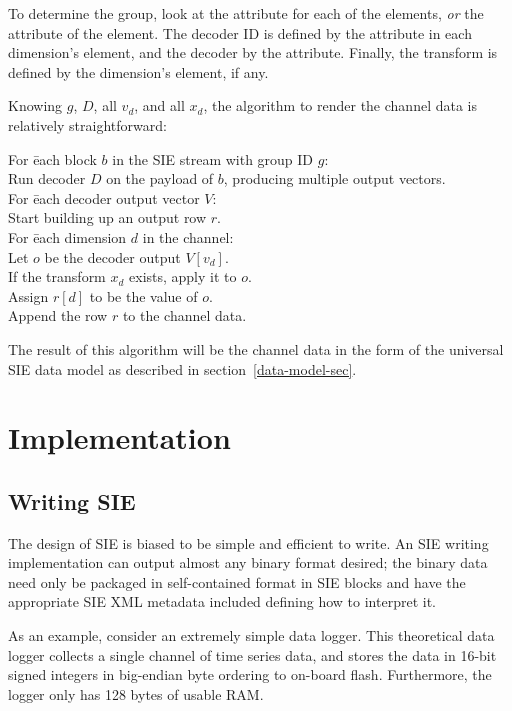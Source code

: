 \documentclass{article}
\begin{document}
To determine the group, look at the  attribute for each of
the  elements, \emph{or} the  attribute of the
 element.  The decoder ID is defined by the 
attribute in each dimension's  element, and the decoder
 by the  attribute.  Finally, the transform is defined
by the dimension's  element, if any.

Knowing $g$, $D$, all $v_d$, and all $x_d$, the algorithm to render
the channel data is relatively straightforward:

\begin{tabbing}
For \= each block $b$ in the SIE stream with group ID $g$: \\
    \> Run decoder $D$ on the payload of $b$, producing multiple
       output vectors. \\
    \> For \= each decoder output vector $V$: \\
    \>     \> Start building up an output row $r$. \\
    \>     \> For \= each dimension $d$ in the channel: \\
    \>     \>     \> Let $o$ be the decoder output $V[v_d]$. \\
    \>     \>     \> If the transform $x_d$ exists, apply it to $o$. \\
    \>     \>     \> Assign $r[d]$ to be the value of $o$. \\
    \>     \> Append the row $r$ to the channel data.
\end{tabbing}

The result of this algorithm will be the channel data in the form of
the universal SIE data model as described in
section~\ref{data-model-sec}.

\section{Implementation}

\subsection{Writing SIE}

The design of SIE is biased to be simple and efficient to write.  An
SIE writing implementation can output almost any binary format
desired; the binary data need only be packaged in self-contained
format in SIE blocks and have the appropriate SIE XML metadata
included defining how to interpret it.

As an example, consider an extremely simple data logger.  This
theoretical data logger collects a single channel of time series data,
and stores the data in 16-bit signed integers in big-endian byte
ordering to on-board flash.  Furthermore, the logger only has 128
bytes of usable RAM.
\end{document}
